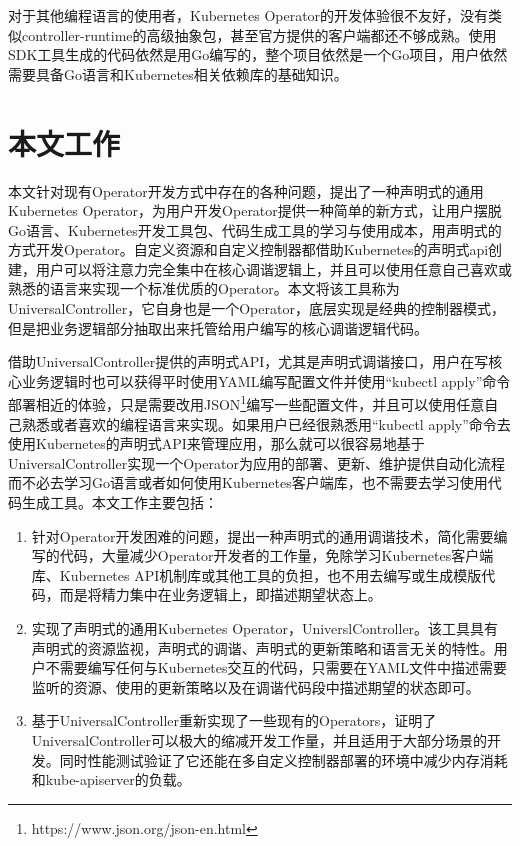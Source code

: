 \documentclass[macfonts,master]{njuthesis}
\begin{document}
对于其他编程语言的使用者，Kubernetes Operator的开发体验很不友好，没有类似controller-runtime的高级抽象包，甚至官方提供的客户端都还不够成熟。使用SDK工具生成的代码依然是用Go编写的，整个项目依然是一个Go项目，用户依然需要具备Go语言和Kubernetes相关依赖库的基础知识\cite{problemofoperators}。

\section{本文工作}
本文针对现有Operator开发方式中存在的各种问题，提出了一种声明式的通用Kubernetes Operator，为用户开发Operator提供一种简单的新方式，让用户摆脱Go语言、Kubernetes开发工具包、代码生成工具的学习与使用成本，用声明式的方式开发Operator。自定义资源和自定义控制器都借助Kubernetes的声明式api创建，用户可以将注意力完全集中在核心调谐逻辑上，并且可以使用任意自己喜欢或熟悉的语言来实现一个标准优质的Operator。本文将该工具称为UniversalController，它自身也是一个Operator，底层实现是经典的控制器模式，但是把业务逻辑部分抽取出来托管给用户编写的核心调谐逻辑代码。

借助UniversalController提供的声明式API，尤其是声明式调谐接口，用户在写核心业务逻辑时也可以获得平时使用YAML编写配置文件并使用``kubectl apply''命令部署相近的体验，只是需要改用JSON\footnote{https://www.json.org/json-en.html}编写一些配置文件，并且可以使用任意自己熟悉或者喜欢的编程语言来实现。如果用户已经很熟悉用``kubectl apply''命令去使用Kubernetes的声明式API来管理应用，那么就可以很容易地基于UniversalController实现一个Operator为应用的部署、更新、维护提供自动化流程而不必去学习Go语言或者如何使用Kubernetes客户端库，也不需要去学习使用代码生成工具。本文工作主要包括：

\begin{enumerate}
	\item 针对Operator开发困难的问题，提出一种声明式的通用调谐技术，简化需要编写的代码，大量减少Operator开发者的工作量，免除学习Kubernetes客户端库、Kubernetes API机制库或其他工具的负担，也不用去编写或生成模版代码，而是将精力集中在业务逻辑上，即描述期望状态上。
	\item 实现了声明式的通用Kubernetes Operator，UniverslController。该工具具有声明式的资源监视，声明式的调谐、声明式的更新策略和语言无关的特性。用户不需要编写任何与Kubernetes交互的代码，只需要在YAML文件中描述需要监听的资源、使用的更新策略以及在调谐代码段中描述期望的状态即可。
	\item 基于UniversalController重新实现了一些现有的Operators，证明了UniversalController可以极大的缩减开发工作量，并且适用于大部分场景的开发。同时性能测试验证了它还能在多自定义控制器部署的环境中减少内存消耗和kube-apiserver的负载。
\end{enumerate}
\end{document}
